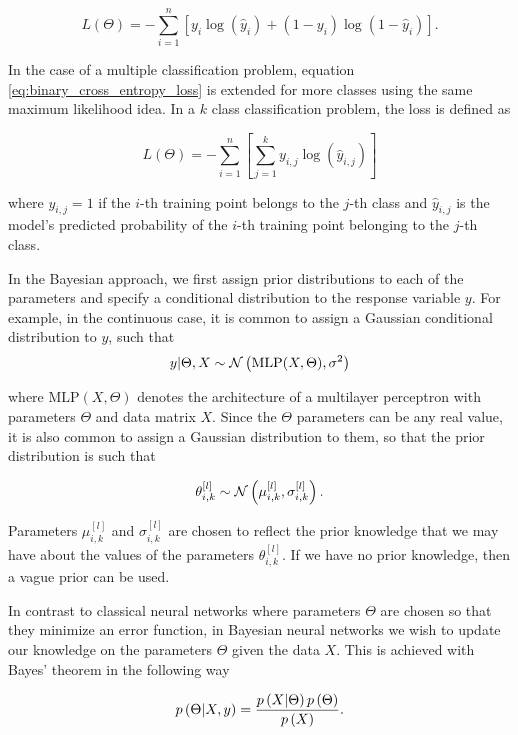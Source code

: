 \begin{equation}
  \label{eq:binary_cross_entropy_loss}
  L(\Theta) = - \sum_{i = 1}^n \left[ y_i \log{\left( \hat{y}_i \right)} + (1 - y_i) \log{\left( 1 - \hat{y}_i \right)} \right].
\end{equation}

In the case of a multiple classification problem, equation \ref{eq:binary_cross_entropy_loss} is extended for more classes using the same maximum likelihood idea. In a $k$ class classification problem, the loss is defined as

\begin{equation*}
  L(\Theta) = - \sum_{i = 1}^n \left[ \sum_{j = 1}^k y_{i,j} \log{\left( \hat{y}_{i,j} \right)}  \right]
\end{equation*}

where $y_{i,j} = 1$ if the $i$-th training point belongs to the $j$-th class and $\hat{y}_{i,j}$ is the model's predicted probability of the $i$-th training point belonging to the $j$-th class.

In the Bayesian approach, we first assign prior distributions to each of the parameters and specify a conditional distribution to the response variable $y$. For example, in the continuous case, it is common to assign a Gaussian conditional distribution to $y$, such that
$$
  y | \Theta, X \sim \mathcal{N}\left( \mathrm{MLP}(X, \Theta), \sigma^2 \right)
$$

where $\mathrm{MLP}(X, \Theta)$ denotes the architecture of a multilayer perceptron with parameters $\Theta$ and data matrix $X$. Since the $\Theta$ parameters can be any real value, it is also common to assign a Gaussian distribution to them, so that the prior distribution is such that

$$
  \theta_{i,k}^{[l]} \sim \mathcal{N}\left( \mu_{i,k}^{[l]}, \sigma_{i,k}^{[l]} \right).
$$

Parameters $\mu_{i,k}^{[l]}$ and $\sigma_{i,k}^{[l]}$ are chosen to reflect the prior knowledge that we may have about the values of the parameters $\theta_{i,k}^{[l]}$. If we have no prior knowledge, then a vague prior can be used.

In contrast to classical neural networks where parameters $\Theta$ are chosen so that they minimize an error function, in Bayesian neural networks we wish to update our knowledge on the parameters $\Theta$ given the data $X$. This is achieved with Bayes' theorem in the following way

$$
  p\left( \Theta | X, y \right) = \frac{p\left( X | \Theta \right) p\left( \Theta \right)}{p\left( X \right)}.
$$

